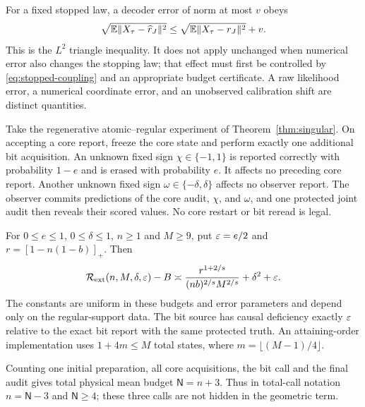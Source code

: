 For a fixed stopped law, a decoder error of norm at most $v$ obeys
\begin{equation}\label{eq:readout}
 \sqrt{\mathbb E\lVert X_\tau-\widehat r_J\rVert^2}
 \le\sqrt{\mathbb E\lVert X_\tau-r_J\rVert^2}+v.
\end{equation}
This is the $L^2$ triangle inequality. It does not apply unchanged when numerical error also changes the stopping law; that effect must first be controlled by \eqref{eq:stopped-coupling} and an appropriate budget certificate. A raw likelihood error, a numerical coordinate error, and an unobserved calibration shift are distinct quantities.

\begin{theorem}\label{thm:joint}
Take the regenerative atomic--regular experiment of Theorem~\ref{thm:singular}. On accepting a core report, freeze the core state and perform exactly one additional bit acquisition. An unknown fixed sign $\chi\in\{-1,1\}$ is reported correctly with probability $1-e$ and is erased with probability $e$. It affects no preceding core report. Another unknown fixed sign $\omega\in\{-\delta,\delta\}$ affects no observer report. The observer commits predictions of the core audit, $\chi$, and $\omega$, and one protected joint audit then reveals their scored values. No core restart or bit reread is legal.

For $0\le e\le1$, $0\le\delta\le1$, $n\ge1$ and $M\ge9$, put $\varepsilon=e/2$ and $r=[1-n(1-b)]_+$. Then
\begin{equation}\label{eq:joint}
 \mathcal R_{\rm ext}(n,M,\delta,\varepsilon)-B
 \asymp
 \frac{r^{1+2/s}}{(nb)^{2/s}M^{2/s}}+\delta^2+\varepsilon.
\end{equation}
The constants are uniform in these budgets and error parameters and depend only on the regular-support data. The bit source has causal deficiency exactly $\varepsilon$ relative to the exact bit report with the same protected truth. An attaining-order implementation uses $1+4m\le M$ total states, where $m=\lfloor(M-1)/4\rfloor$.

Counting one initial preparation, all core acquisitions, the bit call and the final audit gives total physical mean budget $\mathsf N=n+3$. Thus in total-call notation $n=\mathsf N-3$ and $\mathsf N\ge4$; these three calls are not hidden in the geometric term.
\end{theorem}
